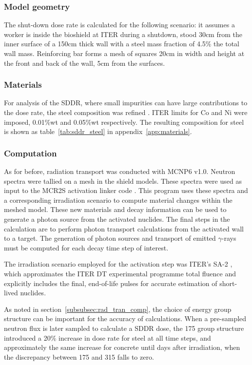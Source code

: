 \subsubsection{Model geometry}
The shut-down dose rate is calculated for the following scenario: it assumes a worker is inside the bioshield at ITER during a shutdown, stood 30cm from the inner surface of a 150cm thick wall with a steel mass fraction of 4.5\% the total wall mass. Reinforcing bar forms a mesh of squares 20cm in width and height at the front and back of the wall, 5cm from the surfaces. 

\subsubsection{Materials}
For analysis of the SDDR, where small impurities can have large contributions to the dose rate, the steel composition was refined \cite{Barabash16}. ITER limits for Co and Ni were imposed, 0.01\%wt and 0.05\%wt respectively. The resulting composition for steel is shown as table~\ref{tab:sddr_steel} in appendix~\ref{app:materials}.

\subsubsection{Computation}
As for before, radiation transport was conducted with MCNP6 v1.0. Neutron spectra were tallied on a mesh in the shield models. These spectra were used as input to the MCR2S activation linker code \cite{Davis2010a}. This program uses these spectra and a corresponding irradiation scenario to compute material changes within the meshed model. These new materials and decay information can be used to generate a photon source from the activated nuclides. The final steps in the calculation are to perform photon transport calculations from the activated wall to a target. The generation of photon sources and transport of emitted $\gamma$-rays must be computed for each decay time step of interest.

The irradiation scenario employed for the activation step was ITER's SA-2 \cite{Loughlin09}, which approximates the ITER DT experimental programme total fluence and explicitly includes the final, end-of-life pulses for accurate estimation of short-lived nuclides.

As noted in section~\ref{subsubsec:rad_tran_comp}, the choice of energy group structure can be important for the accuracy of calculations. When a pre-sampled neutron flux is later sampled to calculate a SDDR dose, the 175 group structure introduced a 20\% increase in dose rate for steel at all time steps, and approximately the same increase for concrete until days after irradiation, when the discrepancy between 175 and 315 falls to zero.

